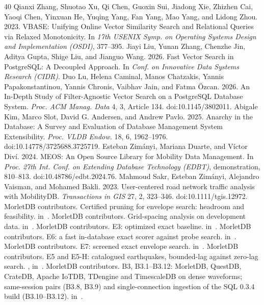 \documentclass[sigconf]{acmart}
\newcommand{\M}{MorletDB}
\begin{document}
\begin{thebibliography}{40}
 Qianxi Zhang, Shuotao Xu, Qi Chen, Guoxin Sui, Jiadong Xie, Zhizhen Cai, Yaoqi Chen, Yinxuan He, Yuqing Yang, Fan Yang, Mao Yang, and Lidong Zhou. 2023. VBASE: Unifying Online Vector Similarity Search and Relational Queries via Relaxed Monotonicity. In \emph{17th USENIX Symp. on Operating Systems Design and Implementation (OSDI)}, 377--395.
 Jiayi Liu, Yunan Zhang, Chenzhe Jin, Aditya Gupta, Shige Liu, and Jianguo Wang. 2026. Fast Vector Search in PostgreSQL: A Decoupled Approach. In \emph{Conf. on Innovative Data Systems Research (CIDR)}.
 Duo Lu, Helena Caminal, Manos Chatzakis, Yannis Papakonstantinou, Yannis Chronis, Vaibhav Jain, and Fatma \"Ozcan. 2026. An In-Depth Study of Filter-Agnostic Vector Search on a PostgreSQL Database System. \emph{Proc. ACM Manag. Data} 4, 3, Article 134. doi:10.1145/3802011.
 Abigale Kim, Marco Slot, David G. Andersen, and Andrew Pavlo. 2025. Anarchy in the Database: A Survey and Evaluation of Database Management System Extensibility. \emph{Proc. VLDB Endow.} 18, 6, 1962--1976. doi:10.14778/3725688.3725719.
 Esteban Zim\'anyi, Mariana Duarte, and V\'ictor Div\'i. 2024. MEOS: An Open Source Library for Mobility Data Management. In \emph{Proc. 27th Int. Conf. on Extending Database Technology (EDBT)}, demonstration, 810--813. doi:10.48786/edbt.2024.76.
 Mahmoud Sakr, Esteban Zim\'anyi, Alejandro Vaisman, and Mohamed Bakli. 2023. User-centered road network traffic analysis with MobilityDB. \emph{Transactions in GIS} 27, 2, 323--346. doi:10.1111/tgis.12972.
 \M{} contributors. Certified pruning for envelope search: headroom and feasibility.  in~\cite{repo}.
 \M{} contributors. Grid-spacing analysis on development data.  in~\cite{repo}.
 \M{} contributors. E3: optimized exact baseline.  in~\cite{repo}.
 \M{} contributors. E6: a fast in-database exact scorer against probe search.  in~\cite{repo}.
 \M{} contributors. E7: screened exact envelope search.  in~\cite{repo}.
 \M{} contributors. E5 and E5-H: catalogued earthquakes, bounded-lag against zero-lag search. ,  in~\cite{repo}.
 \M{} contributors. B3, B3.1--B3.12: \M{}, QuestDB, CrateDB, Apache IoTDB, TDengine and TimescaleDB on dense waveforms; same-session pairs (B3.8, B3.9) and single-connection ingestion of the SQL 0.3.4 build (B3.10--B3.12).  in~\cite{repo}.

\end{thebibliography}
\end{document}
